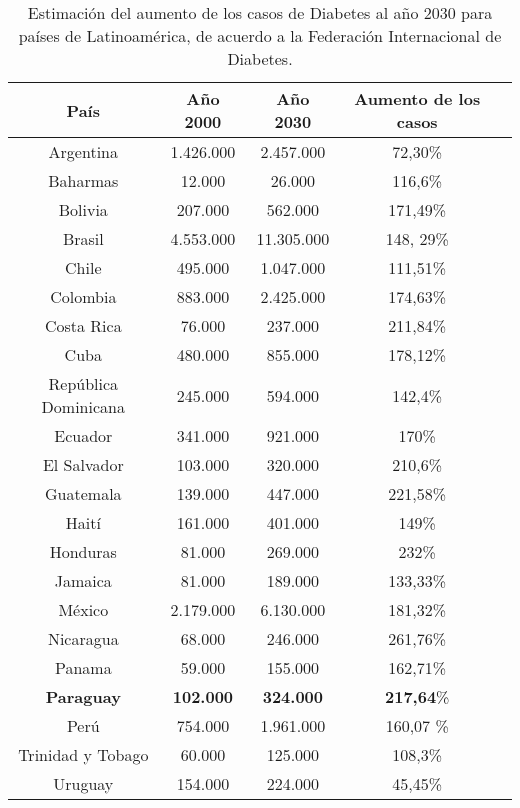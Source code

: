 \begin{table}[!hbtp]
\begin{center}
\small

\caption{Estimación del aumento de los casos de Diabetes al año 2030 para países de Latinoamérica, de acuerdo a la Federación Internacional de Diabetes.}
\label{tab:futuro}
\begin{tabular}{|c|c|c|c| p{2cm}}
\hline
País &  Año 2000 & Año 2030 & Aumento de los casos
 \\ 
\hline
Argentina & 1.426.000 & 2.457.000 & 72,30\% \\
Baharmas & 12.000 &26.000 & 116,6\%\\
Bolivia & 207.000& 562.000 & 171,49\%\\
Brasil & 4.553.000 & 11.305.000 & 148, 29\%  \\
Chile & 495.000 & 1.047.000 & 111,51\%  \\
Colombia & 883.000 & 2.425.000 & 174,63\%   \\
Costa Rica & 76.000& 237.000 & 211,84\%\\
Cuba&480.000& 855.000 & 178,12\%\\
República Dominicana& 245.000& 594.000 & 142,4\% \\
Ecuador & 341.000 & 921.000 & 170\%  \\
El Salvador&103.000&320.000 & 210,6\%\\
Guatemala& 139.000& 447.000 & 221,58\%\\
Haití&  161.000& 401.000 & 149\%\\
Honduras&81.000& 269.000 & 232\%\\
Jamaica& 81.000&189.000 & 133,33\%\\
México&2.179.000& 6.130.000 & 181,32\%\\
Nicaragua&68.000&246.000 & 261,76\%\\
Panama&59.000&155.000 & 162,71\%\\
\textbf{Paraguay} & \textbf{102.000} & \textbf{324.000} & \textbf{217,64}\%  \\
Perú & 754.000 & 1.961.000 & 160,07 \% \\
Trinidad y Tobago&60.000&125.000 & 108,3\%\\
Uruguay& 154.000& 224.000 & 45,45\%\\


\hline
\end{tabular}


\end{center}

\end{table}

